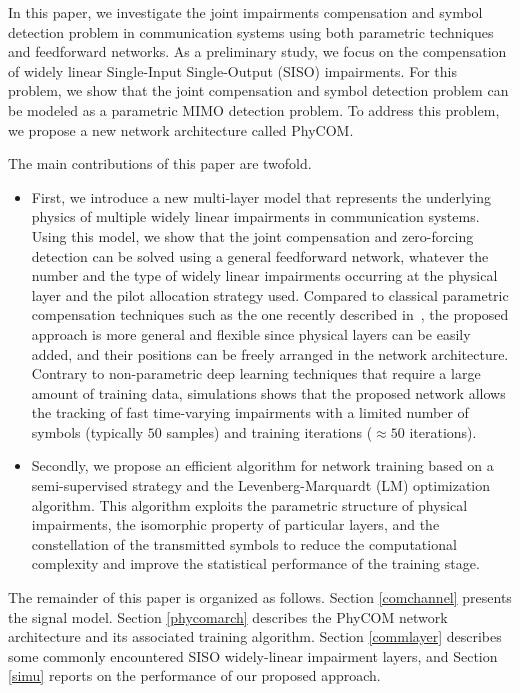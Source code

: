 \documentclass{article}
\begin{document}
In this paper, we investigate the joint impairments compensation and symbol detection problem in communication systems using both parametric techniques and feedforward networks. As a preliminary study, we focus on the compensation of widely linear Single-Input Single-Output (SISO) impairments. For this problem, we show that the joint compensation and symbol detection problem can be modeled as a parametric MIMO detection problem. To address this problem, we propose a new network architecture called PhyCOM.

The main contributions of this paper are twofold.
\begin{itemize}
\item First, we introduce a new multi-layer model that represents the underlying physics of multiple widely linear impairments in communication systems. Using this model, we show that the joint compensation and zero-forcing detection can be solved using a general feedforward network, whatever the number and the type of widely linear impairments occurring at the physical layer and the pilot allocation strategy used. Compared to classical parametric compensation techniques such as the one recently described in~\cite{FRU21}, the proposed approach is more general and flexible since physical layers can be easily added, and their positions can be freely arranged in the network architecture. Contrary to non-parametric deep learning techniques that require a large amount of training data, simulations shows that the proposed network allows the tracking of fast time-varying impairments with a limited number of symbols (typically $50$ samples) and training iterations ($\approx 50$ iterations).
\item Secondly, we propose an efficient algorithm for network training based on a semi-supervised strategy and the Levenberg-Marquardt (LM) optimization algorithm. This algorithm exploits the parametric structure of physical impairments, the isomorphic property of particular layers, and the constellation of the transmitted symbols to reduce the computational complexity and improve the statistical performance of the training stage.  
\end{itemize}

The remainder of this paper is organized as follows. Section \ref{comchannel} presents the signal model. Section \ref{phycomarch} describes the PhyCOM network architecture and its associated training algorithm. Section \ref{commlayer} describes some commonly encountered SISO widely-linear impairment layers, and Section \ref{simu} reports on the performance of our proposed approach.\\
\end{document}
